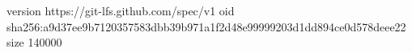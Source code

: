 version https://git-lfs.github.com/spec/v1
oid sha256:a9d37ee9b7120357583dbb39b971a1f2d48e99999203d1dd894ce0d578deee22
size 140000
